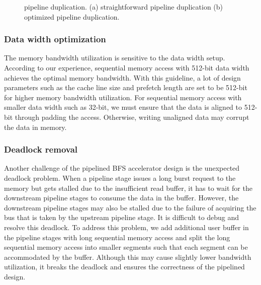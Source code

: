 \begin{figure}
    \caption{pipeline duplication. (a) straightforward pipeline duplication 
    (b) optimized pipeline duplication.}
\label{fig:duplicate-pipeline}
\end{figure}


\subsubsection{Data width optimization}
The memory bandwidth utilization is sensitive to the data width setup. 
According to our experience, sequential memory access 
with 512-bit data width achieves the optimal memory bandwidth. With this guideline, 
a lot of design parameters such as the cache line size and prefetch length are 
set to be 512-bit for higher memory bandwidth utilization. For sequential 
memory access with smaller data width such as 32-bit, we must ensure that the 
data is aligned to 512-bit through padding the access. Otherwise, writing 
unaligned data may corrupt the data in memory.


\subsubsection{Deadlock removal}
Another challenge of the pipelined BFS accelerator design is the 
unexpected deadlock problem. 
When a pipeline stage issues a long burst request to the memory 
but gets stalled due to the insufficient read buffer, it has to 
wait for the downstream pipeline stages to consume the data in the buffer. 
However, the downstream pipeline stages may also be stalled due to 
the failure of acquiring the bus that is taken by the upstream pipeline stage.
It is difficult to debug and resolve this deadlock. To address this problem, we
add additional user buffer in the pipeline stages with long sequential 
memory access and split the long sequential memory access into smaller 
segments such that each segment can be accommodated by the buffer. 
Although this may cause slightly lower bandwidth utilization, it breaks the deadlock and 
ensures the correctness of the pipelined design.

